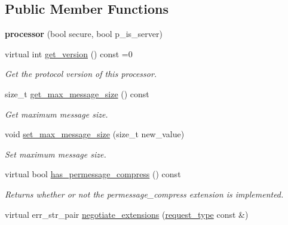 \subsection*{Public Member Functions}
\begin{DoxyCompactItemize}
\item 
\mbox{\label{classwebsocketpp_1_1processor_1_1processor_a7313d1efc0cccc44451c4acabc0e7256}} 
{\bfseries processor} (bool secure, bool p\+\_\+is\+\_\+server)
\item 
\mbox{\label{classwebsocketpp_1_1processor_1_1processor_a53427f90f89cf215060ceb3ce7a06c2d}} 
virtual int \mbox{\hyperlink{classwebsocketpp_1_1processor_1_1processor_a53427f90f89cf215060ceb3ce7a06c2d}{get\+\_\+version}} () const =0
\begin{DoxyCompactList}\small\item\em Get the protocol version of this processor. \end{DoxyCompactList}\item 
size\+\_\+t \mbox{\hyperlink{classwebsocketpp_1_1processor_1_1processor_ade6eea6e4c97065030ed9106613d47f9}{get\+\_\+max\+\_\+message\+\_\+size}} () const
\begin{DoxyCompactList}\small\item\em Get maximum message size. \end{DoxyCompactList}\item 
void \mbox{\hyperlink{classwebsocketpp_1_1processor_1_1processor_ad412d33b168539dfbfa1d7e89908c5d1}{set\+\_\+max\+\_\+message\+\_\+size}} (size\+\_\+t new\+\_\+value)
\begin{DoxyCompactList}\small\item\em Set maximum message size. \end{DoxyCompactList}\item 
virtual bool \mbox{\hyperlink{classwebsocketpp_1_1processor_1_1processor_aadfe0d42b76757aba603d9cc06c9ffd1}{has\+\_\+permessage\+\_\+compress}} () const
\begin{DoxyCompactList}\small\item\em Returns whether or not the permessage\+\_\+compress extension is implemented. \end{DoxyCompactList}\item 
virtual err\+\_\+str\+\_\+pair \mbox{\hyperlink{classwebsocketpp_1_1processor_1_1processor_aad69873505ba59f4ddf53e864f32bb80}{negotiate\+\_\+extensions}} (\mbox{\hyperlink{classwebsocketpp_1_1http_1_1parser_1_1request}{request\+\_\+type}} const \&)

\end{DoxyCompactItemize}

